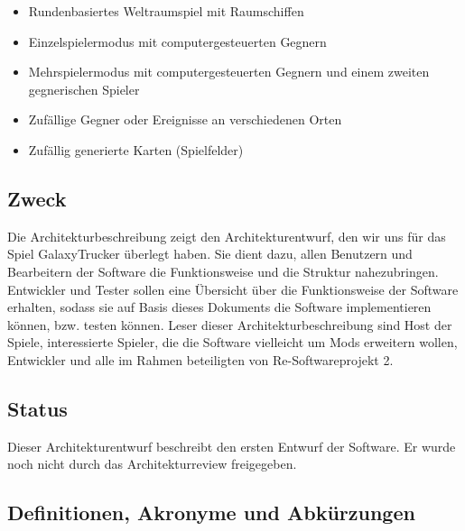 \documentclass[fontsize=12pt,paper=a4,twoside]{scrartcl}
\begin{document}
\begin{itemize}
\item{Rundenbasiertes Weltraumspiel mit Raumschiffen}
\item{Einzelspielermodus mit computergesteuerten Gegnern}
\item{Mehrspielermodus mit computergesteuerten Gegnern und einem zweiten gegnerischen Spieler}
\item{Zufällige Gegner oder Ereignisse an verschiedenen Orten}
\item{Zufällig generierte Karten (Spielfelder)}
\end{itemize}



\subsection{Zweck}

Die Architekturbeschreibung zeigt den Architekturentwurf, den wir uns für das Spiel GalaxyTrucker überlegt haben. Sie dient dazu, allen Benutzern und Bearbeitern der Software die Funktionsweise und die Struktur nahezubringen. Entwickler und Tester sollen eine Übersicht über die Funktionsweise der Software erhalten, sodass sie auf Basis dieses Dokuments die Software implementieren können, bzw. testen können. 
Leser dieser Architekturbeschreibung sind Host der Spiele, interessierte Spieler, die die Software vielleicht um Mods erweitern wollen, Entwickler und alle im Rahmen beteiligten von Re-Softwareprojekt 2. 

\subsection{Status}

Dieser Architekturentwurf beschreibt den ersten Entwurf der Software. Er wurde noch nicht durch das Architekturreview freigegeben. 
  
\subsection{Definitionen, Akronyme und Abkürzungen}
\end{document}
